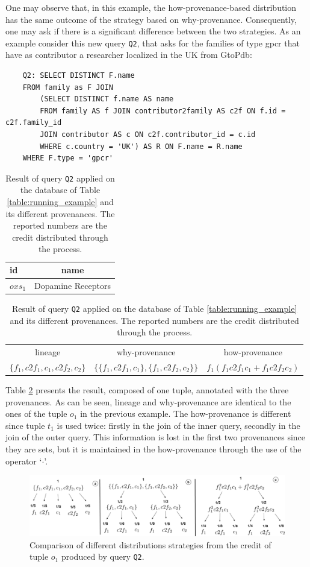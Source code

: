 One may observe that, in this example, the how-provenance-based distribution has the same outcome of the strategy based on why-provenance. Consequently, one may ask if there is a significant difference between the two strategies. 
As an example consider this new query \texttt{Q2}, that asks for the families of type gpcr that have as contributor a researcher localized in the UK from GtoPdb:
\begin{verbatim}
	Q2: SELECT DISTINCT F.name 
	FROM family as F JOIN
		(SELECT DISTINCT f.name AS name
		FROM family AS f JOIN contributor2family AS c2f ON f.id = c2f.family_id
		JOIN contributor AS c ON c2f.contributor_id = c.id
		WHERE c.country = 'UK') AS R ON F.name = R.name
	WHERE F.type = 'gpcr'
\end{verbatim}

\begin{table}[]
\centering
  \begin{tabular}{|l|c|}
  \hline
    id & name\\
    \hline
    $oxs_1$ &  Dopamine Receptors\\
    \hline
  \end{tabular}
  \begin{tabular}{c | c | c}
  	lineage & why-provenance & how-provenance   \\
  	$\{f_1, c2f_1, c_1, c2f_2, c_2\}$ & $\{\{f_1, c2f_1, c_1\}, \{f_1, c2f_2, c_2\}\}$ & $f_1(f_1 c2f_1 c_1 + f_1 c2f_2 c_2)$\\
  \end{tabular}
    \caption{Result of query \texttt{Q2} applied on the database of Table \ref{table:running_example} and its different provenances. The reported numbers are the credit distributed through the process.}
  \label{table:difference_result}
\end{table}

Table \ref{table:difference_result} presents the result, composed of one tuple, annotated with the three provenances. As can be seen, lineage and why-provenance are identical to the ones of the tuple $o_1$ in the previous example. 
The how-provenance is different since tuple $t_1$ is used twice: firstly in the join of the inner query, secondly in the join of the outer query. This information is lost in the first two provenances since they are sets, but it is maintained in the how-provenance through the use of the operator `$\cdot$'.

\begin{figure}[]
  \includegraphics[width=\textwidth]{figures/how_distribution}
  \caption{Comparison of different distributions strategies from the credit of tuple $o_1$ produced by query \texttt{Q2}.}
  \label{figure:distributions_differences}
\end{figure}


